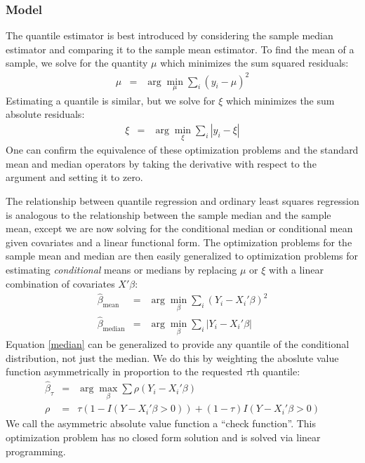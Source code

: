 \subsubsection{Model}
The quantile estimator is best introduced by considering the sample median
estimator and comparing it to the sample mean estimator.
To find the mean of a sample, we solve
for the quantity $\mu$ which minimizes the sum squared residuals:
\begin{eqnarray*}
    \mu &=& \arg\min_\mu \sum_i (y_i-\mu)^2
\end{eqnarray*}
Estimating a quantile is similar, but we solve for $\xi$ which minimizes the
sum absolute residuals:
\begin{eqnarray*}
    \xi &=& \arg\min_\xi \sum_i |y_i-\xi|
\end{eqnarray*}
One can confirm the equivalence of these optimization problems and the standard
mean and median operators by taking the derivative with respect to the argument
and setting it to zero.

The relationship between quantile regression and ordinary least squares regression
is analogous to the relationship between the sample median and the sample mean, except
we are now solving for the conditional median or conditional mean given covariates and
a linear functional form. The optimization problems for the sample mean and median
are then easily generalized to optimization problems for
estimating \emph{conditional} means or medians by replacing $\mu$ or $\xi$
with a linear combination of covariates $X'\beta$:
\begin{eqnarray}
    \hat\beta_\mathrm{mean} &=& \arg\min_\beta \sum_i (Y_i-X_i'\beta)^2 \nonumber \\
    \hat\beta_\mathrm{median} &=& \arg\min_\beta \sum_i |Y_i-X_i'\beta| \label{median}
\end{eqnarray}
Equation \ref{median} can be generalized to provide any quantile of the conditional
distribution, not just the median. We do this by weighting the aboslute value function
asymmetrically in proportion to the requested $\tau$th quantile:
\begin{eqnarray}
    \hat\beta_{\tau} &=& \arg\max_\beta \sum \rho(Y_i-X_i'\beta) \label{beta}\\
    \rho &=& \tau(1-I(Y-X_i'\beta > 0)) + (1-\tau)I(Y-X_i'\beta > 0) \nonumber
\end{eqnarray}
We call the asymmetric absolute value function a ``check function''. This optimization
problem has no closed form solution and is solved via linear programming.

